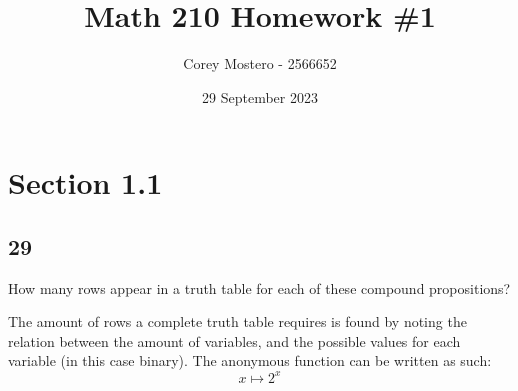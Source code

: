 \documentclass{article}
\title{Math 210 Homework \#1}
\date{29 September 2023}
\author{Corey Mostero - 2566652}
\begin{document}
\newcommand{\hr}{\par\noindent\rule{\textwidth}{0.4pt}}

\newcommand{\bc}[1]{
	\begin{equation*}
		\begin{boxed}
			{#1}
		\end{boxed}
	\end{equation*}
}

\newcommand{\cond}[2]{
	\ifmmode
	{#1} \quad {#2}
	\else
	$$ {#1} \quad {#2} $$
	\fi
}

\newcommand{\matr}[1]{
	\ifmmode \bm{#1}
	\else \textit{\textbf{#1}}
	\fi
}
\newcommand{\vect}[1]{
	\ifmmode \mathbf{#1}
	\else \textbf{#1}
	\fi
}


\newcommand{\boldalph}[0]{ \textbf{\alph*)} }

\maketitle
\newpage

\tableofcontents

\section{Section 1.1}

\subsection{29}

How many rows appear in a truth table for each of these compound propositions?

The amount of rows a complete truth table requires is found by noting the relation between the amount of variables, and the possible values for each variable (in this case binary). The anonymous function can be written as such:
\begin{equation}
	x \mapsto 2^{x} \label{truth_table_rows}
\end{equation}
\end{document}
